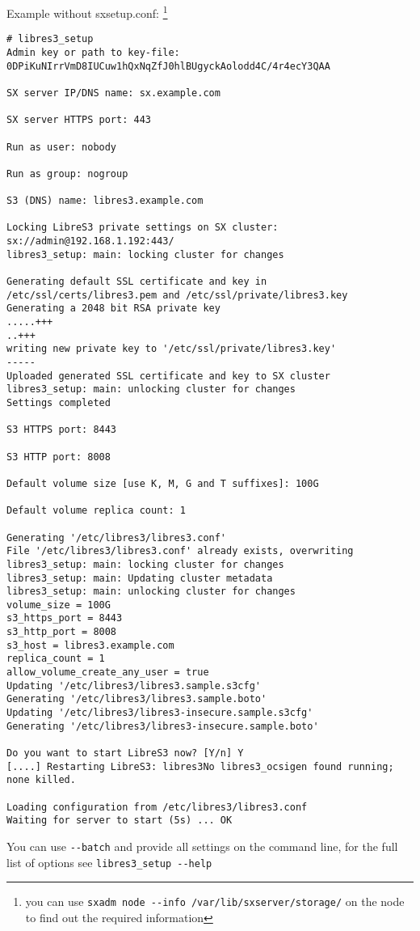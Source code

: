 Example without sxsetup.conf:
\footnote{you can use \texttt{sxadm node -{}-info /var/lib/sxserver/storage/} on the \SX node to find out the required information}

\begin{lstlisting}
# libres3_setup
Admin key or path to key-file: 0DPiKuNIrrVmD8IUCuw1hQxNqZfJ0hlBUgyckAolodd4C/4r4ecY3QAA

SX server IP/DNS name: sx.example.com

SX server HTTPS port: 443

Run as user: nobody

Run as group: nogroup

S3 (DNS) name: libres3.example.com

Locking LibreS3 private settings on SX cluster: sx://admin@192.168.1.192:443/
libres3_setup: main: locking cluster for changes

Generating default SSL certificate and key in /etc/ssl/certs/libres3.pem and /etc/ssl/private/libres3.key
Generating a 2048 bit RSA private key
.....+++
..+++
writing new private key to '/etc/ssl/private/libres3.key'
-----
Uploaded generated SSL certificate and key to SX cluster
libres3_setup: main: unlocking cluster for changes
Settings completed

S3 HTTPS port: 8443

S3 HTTP port: 8008

Default volume size [use K, M, G and T suffixes]: 100G

Default volume replica count: 1

Generating '/etc/libres3/libres3.conf'
File '/etc/libres3/libres3.conf' already exists, overwriting
libres3_setup: main: locking cluster for changes
libres3_setup: main: Updating cluster metadata
libres3_setup: main: unlocking cluster for changes
volume_size = 100G
s3_https_port = 8443
s3_http_port = 8008
s3_host = libres3.example.com
replica_count = 1
allow_volume_create_any_user = true
Updating '/etc/libres3/libres3.sample.s3cfg'
Generating '/etc/libres3/libres3.sample.boto'
Updating '/etc/libres3/libres3-insecure.sample.s3cfg'
Generating '/etc/libres3/libres3-insecure.sample.boto'

Do you want to start LibreS3 now? [Y/n] Y
[....] Restarting LibreS3: libres3No libres3_ocsigen found running; none killed.

Loading configuration from /etc/libres3/libres3.conf
Waiting for server to start (5s) ... OK
\end{lstlisting}

You can use \verb|--batch| and provide all settings on the command line,
for the full list of options see \verb|libres3_setup --help|

